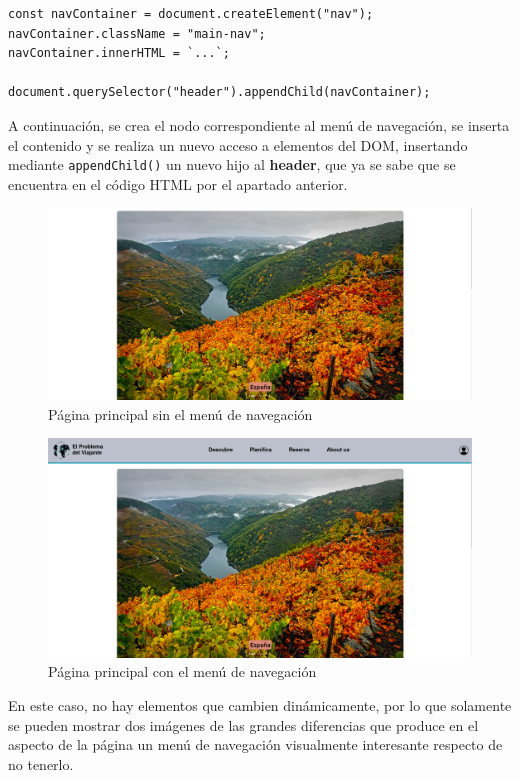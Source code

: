 \documentclass[11pt, a4paper]{book}
\begin{document}
	\begin{lstlisting}
const navContainer = document.createElement("nav");
navContainer.className = "main-nav";
navContainer.innerHTML = `...`;

document.querySelector("header").appendChild(navContainer);
	\end{lstlisting}
	
	A continuación, se crea el nodo correspondiente al menú de navegación, se inserta el contenido y se realiza un nuevo acceso a elementos del DOM, insertando mediante \texttt{appendChild()} un nuevo hijo al \textbf{header}, que ya se sabe que se encuentra en el código HTML por el apartado anterior.
	
	\begin{figure} [H]
		\centering
		\includegraphics[width=\textwidth]{CSS/1-1 1920cut.png}
		\caption{Página principal sin el menú de navegación}
	\end{figure}
	\begin{figure} [H]
		\centering
		\includegraphics[width=\textwidth]{CSS/1-1 1920.png}
		\caption{Página principal con el menú de navegación}
	\end{figure}

	En este caso, no hay elementos que cambien dinámicamente, por lo que solamente se pueden mostrar dos imágenes de las grandes diferencias que produce en el aspecto de la página un menú de navegación visualmente interesante respecto de no tenerlo.
	
\end{document}
